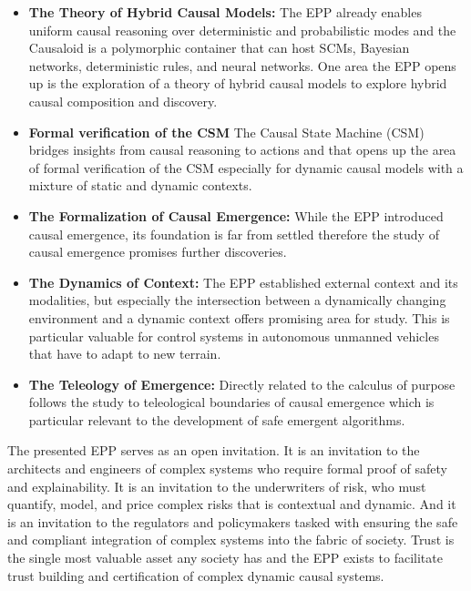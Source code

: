 \begin{itemize}
	\item \textbf{The Theory of Hybrid Causal Models:} The EPP already enables uniform causal reasoning over deterministic and probabilistic modes and the Causaloid is a polymorphic container that can host SCMs, Bayesian networks, deterministic rules, and neural networks. One area the EPP opens up is the exploration of a theory of hybrid causal models to explore hybrid causal composition and discovery.    
	\item \textbf{Formal verification of the CSM} The Causal State Machine (CSM) bridges insights from causal reasoning to actions and that opens up the area of formal verification of the CSM especially for dynamic causal models with a mixture of static and dynamic contexts.  	
	\item \textbf{The Formalization of Causal Emergence:} While the EPP introduced causal emergence, its foundation is far from settled therefore the study of causal emergence promises further discoveries.
	\item \textbf{The Dynamics of Context:} The EPP established external context and its modalities, but especially the intersection between a dynamically changing environment and a dynamic context offers promising area for study. This is particular valuable for control systems in autonomous unmanned vehicles that have to adapt to new terrain. 
	\item \textbf{The Teleology of Emergence:} Directly related to the calculus of purpose follows the study to teleological boundaries of causal emergence which is particular relevant to the development of safe emergent algorithms. 
\end{itemize}


The presented EPP serves as an open invitation. It is an invitation to the architects and engineers of complex systems who require formal proof of safety and explainability. It is an invitation to the underwriters of risk, who must quantify, model, and price complex risks that is contextual and dynamic. And it is an invitation to the regulators and policymakers tasked with ensuring the safe and compliant integration of complex systems into the fabric of society. Trust is the single most valuable asset any society has and the EPP exists to facilitate trust building and certification of complex dynamic causal systems. 

\newpage